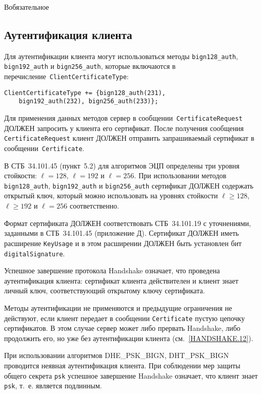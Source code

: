 \begin{appendix}{В}{обязательное}
\subsection{Аутентификация клиента}\label{BSUITES.3.2}

Для аутентификации клиента могут использоваться методы
\mbox{\lstinline{bign128_auth},} \lstinline{bign192_auth} и
\lstinline{bign256_auth}, которые включаются в 
перечисление~\lstinline{ClientCertificateType}: 
\begin{lstlisting}
ClientCertificateType += {bign128_auth(231),
    bign192_auth(232), bign256_auth(233)};
\end{lstlisting}

Для применения данных методов сервер в сообщении~\lstinline{CertificateRequest} 
ДОЛЖЕН запросить у клиента его сертификат. После получения сообщения 
\lstinline{CertificateRequest} клиент ДОЛЖЕН отправить запрашиваемый сертификат 
в сообщении~\lstinline{Certificate}.  

В СТБ~34.101.45 (пункт~5.2) для алгоритмов ЭЦП определены три уровня 
стойкости: $\ell = 128$, $\ell = 192$ и $\ell = 256$. При использовании методов 
\lstinline{bign128_auth}, \lstinline{bign192_auth} и 
\lstinline{bign256_auth} сертификат ДОЛЖЕН содержать открытый ключ, 
который можно использовать на уровнях стойкости $\ell\geq 128$,  
$\ell\geq 192$ и $\ell = 256$ соответственно.  

Формат сертификата ДОЛЖЕН соответствовать СТБ~34.101.19 с уточнениями, 
заданными в СТБ~34.101.45 (приложение Д). Сертификат ДОЛЖЕН иметь 
расширение \lstinline{KeyUsage} и в этом расширении ДОЛЖЕН быть установлен бит 
\lstinline{digitalSignature}. 

Успешное завершение протокола Handshake означает, что проведена 
аутентификация клиента: сертификат клиента действителен и клиент знает 
личный ключ, соответствующий открытому ключу сертификата. 

Методы аутентификации не применяются и предыдущие ограничения не 
действуют, если клиент передает в сообщении \lstinline{Certificate} пустую цепочку 
сертификатов. В этом случае сервер может либо прервать Handshake, либо 
продолжить его, но уже без аутентификации клиента (см.~\ref{HANDSHAKE.12}). 

При использовании алгоритмов DHE\_PSK\_BIGN, DHT\_PSK\_BIGN проводится неявная 
аутентификация клиента. При соблюдении мер защиты общего секрета \lstinline{psk} 
успешное завершение Handshake означает, что клиент знает \lstinline{psk}, 
т.~е. является подлинным. 


\end{appendix}
